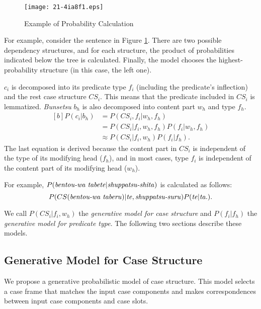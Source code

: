 \documentclass[english]{jnlp_1.4_rep}
\begin{document}
\begin{figure}[t]
 \begin{center}
  \texttt{[image: 21-4ia8f1.eps]}
 \end{center}
  \caption{Example of Probability Calculation}
  \label{Figure::Outline}
\end{figure}

For example, consider the sentence in Figure \ref{Figure::Outline}.
There are two possible dependency structures, and for each structure, the
product of probabilities indicated below the tree is
calculated. Finally, the model chooses the highest-probability
structure (in this case, the left one).

$c_i$ is decomposed into its predicate type $f_i$ (including the
predicate's inflection) and the rest case structure $CS_i$. This means
that the predicate included in $CS_i$ is lemmatized. \textit{Bunsetsu}
$b_h$ is also decomposed into content part $w_h$ and type $f_h$.
\begin{equation}
\begin{aligned}[b]
 P(c_i|b_h) & = P(CS_i, f_i|w_h, f_h) \\
                & = P(CS_i|f_i,w_h,f_h) P(f_i|w_h,f_h) \\
                & \approx P(CS_i|f_i,w_h) P(f_i|f_h).
\end{aligned}
\label{Equation::Dependency}
\end{equation}
The last equation is derived because the content part in $CS_i$ is
independent of the type of its modifying head ($f_h$), and in most
cases, type $f_i$ is independent of the content part of its
modifying head ($w_h$).

For example, $P(\mbox{\textit{bentou-wa tabete}}|\mbox{\textit{shuppatsu-shita}})$ is calculated as follows:
\[
P(CS(\mbox{\textit{bentou-wa taberu}})|\mbox{\textit{te}},\mbox{\textit{shuppatsu-suru}}) P(\mbox{\textit{te}}|\mbox{\textit{ta.}}).
\]

We call $P(CS_i|f_i,w_h)$ the \textit{generative model for case
structure} and $P(f_i|f_h)$ the \textit{generative model for predicate type}.
The following two sections describe these models.


\subsection{Generative Model for Case Structure}

We propose a generative probabilistic model of case structure. This
model selects a case frame that matches the input case components and
makes correspondences between input case components and case slots.
\end{document}
